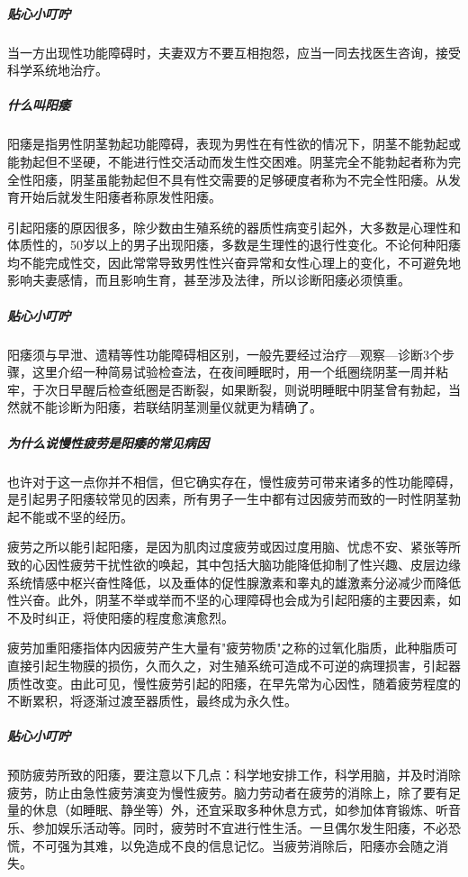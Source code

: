\begin{enumerate}
\subparagraph{贴心小叮咛}

当一方出现性功能障碍时，夫妻双方不要互相抱怨，应当一同去找医生咨询，接受科学系统地治疗。

\subparagraph{什么叫阳痿}

阳痿是指男性阴茎勃起功能障碍，表现为男性在有性欲的情况下，阴茎不能勃起或能勃起但不坚硬，不能进行性交活动而发生性交困难。阴茎完全不能勃起者称为完全性阳痿，阴茎虽能勃起但不具有性交需要的足够硬度者称为不完全性阳痿。从发育开始后就发生阳痿者称原发性阳痿。

引起阳痿的原因很多，除少数由生殖系统的器质性病变引起外，大多数是心理性和体质性的，50岁以上的男子出现阳痿，多数是生理性的退行性变化。不论何种阳痿均不能完成性交，因此常常导致男性性兴奋异常和女性心理上的变化，不可避免地影响夫妻感情，而且影响生育，甚至涉及法律，所以诊断阳痿必须慎重。

\subparagraph{贴心小叮咛}

阳痿须与早泄、遗精等性功能障碍相区别，一般先要经过治疗—观察—诊断3个步骤，这里介绍一种简易试验检查法，在夜间睡眠时，用一个纸圈绕阴茎一周并粘牢，于次日早醒后检查纸圈是否断裂，如果断裂，则说明睡眠中阴茎曾有勃起，当然就不能诊断为阳痿，若联结阴茎测量仪就更为精确了。

\subparagraph{为什么说慢性疲劳是阳痿的常见病因}

也许对于这一点你并不相信，但它确实存在，慢性疲劳可带来诸多的性功能障碍，是引起男子阳痿较常见的因素，所有男子一生中都有过因疲劳而致的一时性阴茎勃起不能或不坚的经历。

疲劳之所以能引起阳痿，是因为肌肉过度疲劳或因过度用脑、忧虑不安、紧张等所致的心因性疲劳干扰性欲的唤起，其中包括大脑功能降低抑制了性兴趣、皮层边缘系统情感中枢兴奋性降低，以及垂体的促性腺激素和睾丸的雄激素分泌减少而降低性兴奋。此外，阴茎不举或举而不坚的心理障碍也会成为引起阳痿的主要因素，如不及时纠正，将使阳痿的程度愈演愈烈。

疲劳加重阳痿指体内因疲劳产生大量有"疲劳物质"之称的过氧化脂质，此种脂质可直接引起生物膜的损伤，久而久之，对生殖系统可造成不可逆的病理损害，引起器质性改变。由此可见，慢性疲劳引起的阳痿，在早先常为心因性，随着疲劳程度的不断累积，将逐渐过渡至器质性，最终成为永久性。

\subparagraph{贴心小叮咛}

预防疲劳所致的阳痿，要注意以下几点：科学地安排工作，科学用脑，并及时消除疲劳，防止由急性疲劳演变为慢性疲劳。脑力劳动者在疲劳的消除上，除了要有足量的休息（如睡眠、静坐等）外，还宜采取多种休息方式，如参加体育锻炼、听音乐、参加娱乐活动等。同时，疲劳时不宜进行性生活。一旦偶尔发生阳痿，不必恐慌，不可强为其难，以免造成不良的信息记忆。当疲劳消除后，阳痿亦会随之消失。


\end{enumerate}
